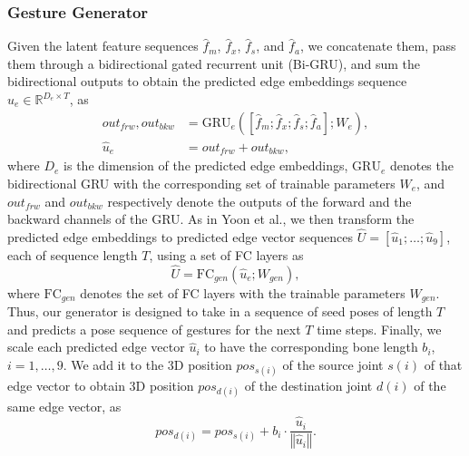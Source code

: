 \documentclass[conference,compsoc]{IEEEtran}
\theoremstyle{definition}
\newcommand{\parens}[1]{\left(#1\right)}
\newcommand{\bracks}[1]{\left[#1\right]}
\newcommand{\norm}[1]{\left\Vert#1\right\Vert}
\begin{document}
\subsubsection{Gesture Generator}
Given the latent feature sequences $\hat{f}_m$, $\hat{f}_x$, $\hat{f}_s$, and $\hat{f}_a$, we concatenate them, pass them through a bidirectional gated recurrent unit (Bi-GRU), and sum the bidirectional outputs to obtain the predicted edge embeddings sequence $\hat{u}_e \in \mathbb{R}^{D_{e} \times T}$, as
\begin{align}
    out_{frw}, out_{bkw} &= \textrm{GRU}_e\parens{\bracks{\hat{f}_m; \hat{f}_x; \hat{f}_s; \hat{f}_a}; W_e}, \\
    \hat{u}_e &= out_{frw} + out_{bkw},
\end{align}
where $D_e$ is the dimension of the predicted edge embeddings, $\textrm{GRU}_e$ denotes the bidirectional GRU with the corresponding set of trainable parameters $W_e$, and $out_{frw}$ and $out_{bkw}$ respectively denote the outputs of the forward and the backward channels of the GRU. As in Yoon et al., we then transform the predicted edge embeddings to predicted edge vector sequences $\hat{U} = \bracks{\hat{u}_1; \dots; \hat{u}_9}$, each of sequence length $T$, using a set of FC layers as
\begin{equation}
    \hat{U} = \textrm{FC}_{gen}\parens{\hat{u}_e; W_{gen}},
\end{equation}
where $\textrm{FC}_{gen}$ denotes the set of FC layers with the trainable parameters $W_{gen}$. Thus, our generator is designed to take in a sequence of seed poses of length $T$ and predicts a pose sequence of gestures for the next $T$ time steps. Finally, we scale each predicted edge vector $\hat{u}_i$ to have the corresponding bone length $b_i$, $i = 1, \dots, 9$. We add it to the 3D position $pos_{s\parens{i}}$ of the source joint $s\parens{i}$ of that edge vector to obtain 3D position $pos_{d\parens{i}}$ of the destination joint $d\parens{i}$ of the same edge vector, as
\begin{equation}
    pos_{d\parens{i}} = pos_{s\parens{i}} + b_i\cdot\frac{\hat{u}_i}{\norm{\hat{u}_i}}.
\end{equation}
\end{document}
